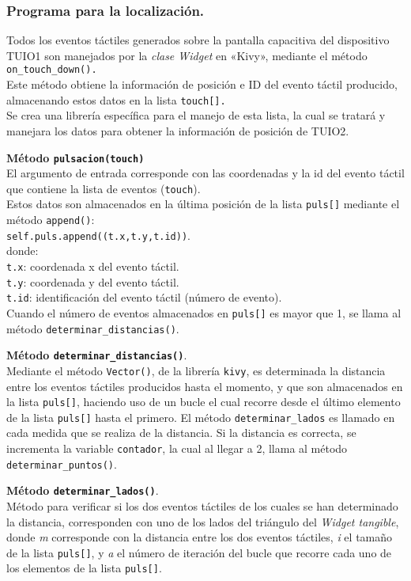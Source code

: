 \subsubsection{Programa para la localización.}

Todos los eventos táctiles generados sobre la pantalla capacitiva del dispositivo TUIO1 son manejados por la \textit{clase Widget} en «Kivy», mediante el método \texttt{on\_touch\_down().}\\
Este método obtiene la información de posición e ID del evento táctil producido, almacenando estos datos en la lista \texttt{touch[].}\\
Se crea una librería específica para el manejo de esta lista, la cual se tratará y manejara los datos para obtener la información de posición de TUIO2.

\textbf{Método \texttt{pulsacion(touch)}}\\
El argumento de entrada corresponde con las coordenadas y la id del evento táctil que contiene la lista de eventos (\texttt{touch}).\\
Estos datos son almacenados en la última posición de la lista \texttt{puls[]} mediante el método \texttt{append()}:\\
\texttt{self.puls.append((t.x,t.y,t.id))}.\\
donde: \\
\texttt{t.x}: coordenada x del evento táctil.\\
\texttt{t.y}: coordenada y del evento táctil.\\
\texttt{t.id}: identificación del evento táctil (número de evento).\\
Cuando el número de eventos almacenados en \texttt{puls[]}   
es mayor que 1, se llama al método \texttt{determinar\_distancias()}.

\textbf{Método \texttt{determinar\_distancias()}}.\\
Mediante el método \texttt{Vector()}, de la librería \texttt{kivy}, es determinada la distancia entre los eventos táctiles producidos hasta el momento, y que son almacenados en la lista \texttt{puls[]}, haciendo uso de un bucle el cual recorre desde el último elemento de la lista \texttt{puls[]} hasta el primero. El método \texttt{determinar\_lados} es llamado en cada medida que se realiza de la distancia. Si la distancia es correcta, se incrementa la variable \texttt{contador}, la cual al llegar a 2, llama al método \texttt{determinar\_puntos()}.

\textbf{Método \texttt{determinar\_lados()}}.\\
Método para verificar si los dos eventos táctiles de los cuales se han determinado la distancia, corresponden con uno de los lados del triángulo del \textit{Widget tangible}, donde \textit{m} corresponde con la distancia entre los dos eventos táctiles, \textit{i} el tamaño de la lista \texttt{puls[]}, y \textit{a} el número de iteración del bucle que recorre cada uno de los elementos de la lista \texttt{puls[]}.


